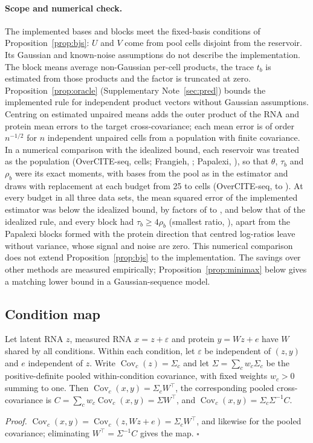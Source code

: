 \paragraph{Scope and numerical check.} The implemented bases and blocks meet the fixed-basis conditions of Proposition~\ref{prop:bjs}: $U$ and $V$ come from pool cells disjoint from the reservoir. Its Gaussian and known-noise assumptions do not describe the implementation. The block means average non-Gaussian per-cell products, the trace $t_b$ is estimated from those products and the factor is truncated at zero. Proposition~\ref{prop:oracle} (Supplementary Note~\ref{sec:pred}) bounds the implemented rule for independent product vectors without Gaussian assumptions. Centring on estimated unpaired means adds the outer product of the RNA and protein mean errors to the target cross-covariance; each mean error is of order $n^{-1/2}$ for $n$ independent unpaired cells from a population with finite covariance. In a numerical comparison with the idealized bound, each reservoir was treated as the population (OverCITE-seq, \SpBoundCellsOc{} cells; Frangieh, \SpBoundCellsFr; Papalexi, \SpBoundCellsPa), so that $\theta$, $\tau_b$ and $\rho_b$ were its exact moments, with bases from the pool as in the estimator and \SpBoundDraws{} draws with replacement at each budget from 25 to \SpBoundBudgetMaxFr{} cells (OverCITE-seq, to \SpBoundBudgetMaxOc). At every budget in all three data sets, the mean squared error of the implemented estimator was below the idealized bound, by factors of \SpBoundRatioMin{} to \SpBoundRatioMax, and below that of the idealized rule, and every block had $\tau_b\ge4\rho_b$ (smallest ratio, \SpBoundEffDimMin), apart from the Papalexi blocks formed with the protein direction that centred log-ratios leave without variance, whose signal and noise are zero. This numerical comparison does not extend Proposition~\ref{prop:bjs} to the implementation. The savings over other methods are measured empirically; Proposition~\ref{prop:minimax} below gives a matching lower bound in a Gaussian-sequence model.


\subsection*{Condition map}
\begin{proposition}\label{prop:map}
Let latent RNA $z$, measured RNA $x=z+\varepsilon$ and protein $y=Wz+e$ have $W$ shared by all conditions. Within each condition, let $\varepsilon$ be independent of $(z,y)$ and $e$ independent of $z$. Write $\operatorname{Cov}_c(z)=\Sigma_c$ and let $\Sigma=\sum_c w_c\Sigma_c$ be the positive-definite pooled within-condition covariance, with fixed weights $w_c>0$ summing to one. Then $\operatorname{Cov}_c(x,y)=\Sigma_cW^\top$, the corresponding pooled cross-covariance is $C=\sum_c w_c\operatorname{Cov}_c(x,y)=\Sigma W^\top$, and $\operatorname{Cov}_c(x,y)=\Sigma_c\Sigma^{-1}C$.
\end{proposition}
\noindent\textit{Proof.} $\operatorname{Cov}_c(x,y)=\operatorname{Cov}_c(z,Wz+e)=\Sigma_cW^\top$, and likewise for the pooled covariance; eliminating $W^\top=\Sigma^{-1}C$ gives the map. $\square$

